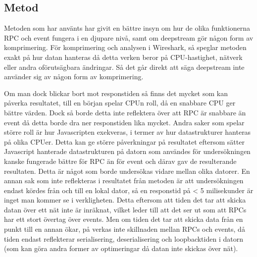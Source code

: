 \subsection{Metod}
\label{subsec:tim-discussion-method}
Metoden som har använts har givit en bättre insyn om hur de olika funktionerna RPC och event fungera i en djupare nivå, samt om deepstream gör någon form av komprimering. För komprimering och analysen i Wireshark, så speglar metoden exakt på hur datan hanteras då detta verken beror på CPU-hastighet, nätverk eller andra oförutsägbara ändringar. Så det går direkt att säga deepstream inte använder sig av någon form av komprimering.

Om man dock blickar bort mot responstiden så finns det mycket som kan påverka resultatet, till en början spelar CPUn roll, då en snabbare CPU ger bättre värden. Dock så borde detta inte reflektera över att RPC är snabbare än event då detta borde dra ner responstiden lika mycket. Andra saker som spelar större roll är hur Javascripten exekveras, i termer av hur datastrukturer hanteras på olika CPUer. Detta kan ge större påverkningar på resultatet eftersom sätter Javascript hanterade datastrukturen på datorn som användes för undersökningen kanske fungerade bättre för RPC än för event och därav gav de resulterande resultaten. Detta är något som borde undersökas vidare mellan olika datorer. En annan sak som inte reflekteras i resultatet från metoden är att undersökningen endast kördes från och till en lokal dator, så en responstid på < 5 milisekunder är inget man kommer se i verkligheten. Detta eftersom att tiden det tar att skicka datan över ett nät inte är inräknat, vilket leder till att det ser ut som att RPCs har ett stort övertag över events. Men om tiden det tar att skicka data från en punkt till en annan ökar, på verkas inte skillnaden mellan RPCs och events, då tiden endast reflekterar serialisering, deserialisering och loopbacktiden i datorn (som kan göra andra former av optimeringar då datan inte skickas över nät).
